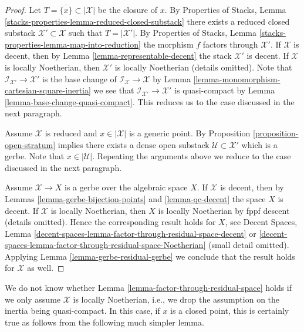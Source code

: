 \begin{proof}
Let $T = \overline{\{x\}} \subset |\mathcal{X}|$ be the closure of $x$.
By Properties of Stacks, Lemma
\ref{stacks-properties-lemma-reduced-closed-substack}
there exists a reduced closed substack $\mathcal{X}' \subset \mathcal{X}$
such that $T = |\mathcal{X}'|$. By Properties of Stacks, Lemma
\ref{stacks-properties-lemma-map-into-reduction} the
morphism $f$ factors through $\mathcal{X}'$. If $\mathcal{X}$ is decent,
then by Lemma \ref{lemma-representable-decent} the stack
$\mathcal{X}'$ is decent. If $\mathcal{X}$ is locally Noetherian,
then $\mathcal{X}'$ is locally Noetherian (details omitted).
Note that $\mathcal{I}_{\mathcal{X}'} \to \mathcal{X}'$
is the base change of $\mathcal{I}_\mathcal{X} \to \mathcal{X}$ by
Lemma \ref{lemma-monomorphism-cartesian-square-inertia}
we see that $\mathcal{I}_{\mathcal{X}'} \to \mathcal{X}'$ is
quasi-compact by Lemma \ref{lemma-base-change-quasi-compact}.
This reduces us to the case discussed in the next paragraph.

\medskip\noindent
Assume $\mathcal{X}$ is reduced and $x \in |\mathcal{X}|$
is a generic point. By Proposition \ref{proposition-open-stratum}
implies there exists a dense open substack
$\mathcal{U} \subset \mathcal{X}'$ which is a gerbe.
Note that $x \in |\mathcal{U}|$.
Repeating the arguments above we reduce to the case discussed
in the next paragraph.

\medskip\noindent
Assume $\mathcal{X} \to X$ is a gerbe over the algebraic space $X$.
If $\mathcal{X}$ is decent, then by
Lemmas \ref{lemma-gerbe-bijection-points} and \ref{lemma-qc-decent}
the space $X$ is decent. If $\mathcal{X}$ is locally Noetherian,
then $X$ is locally Noetherian by fppf descent (details omitted).
Hence the corresponding result holds for $X$, see Decent Spaces, Lemma
\ref{decent-spaces-lemma-factor-through-residual-space-decent} or
\ref{decent-spaces-lemma-factor-through-residual-space-Noetherian}
(small detail omitted).
Applying Lemma \ref{lemma-gerbe-residual-gerbe} we conclude that the result
holds for $\mathcal{X}$ as well.
\end{proof}

\begin{remark}
\label{lemma-factor-through-residual-space-Noetherian}
We do not know whether Lemma \ref{lemma-factor-through-residual-space}
holds if we only assume $\mathcal{X}$ is locally Noetherian, i.e., we
drop the assumption on the inertia being quasi-compact. In this case,
if $x$ is a closed point, this is certainly true as follows from the
following much simpler lemma.
\end{remark}

